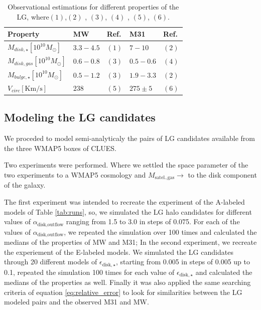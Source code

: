 \documentclass[usenatbib]{mn2e}
\begin{document}
\begin{table}
\centering
\begin{tabular}{|l|l|l|l|l|}
\hline
\hline
 Property &  MW &  Ref. & M31 & Ref.\\
\hline
$M_{disk,\star}[10^{10}M_{\odot}]$ & $3.3-4.5 $ &  $(1)$ & $7-10$ & $(2)$ \\
$M_{disk,gas}[10^{10}M_{\odot}]$ & $0.6-0.8$ &  $(3)$ & $0.5-0.6$ &  $(4)$ \\
$M_{bulge,\star}[10^{10}M_{\odot}]$ & $0.5-1.2$ & $(3)$ & $1.9-3.3$ &  $(2)$ \\
$V_{circ}[\text{Km/s}]$ & $238$ &  $(5)$ & $275\pm 5$ & $(6)$ \\
\hline
\hline
\end{tabular}
\caption{Observational estimations for different properties of the LG,
  where$(1)$\citet{2001ApJ...555..393Z},$(2)$
  \citet{2006MNRAS.366..996G}, $(3)$\citet{2009A&A...505..497Y}, $(4)$
  \citet{2006A&A...453..459N}, $(5)$\citet{2005MNRAS.364..433B},
  $(6)$\citet{2008MNRAS.389.1911S}.} 
\label{tab:lg-observations}
\end{table}

\subsection{Modeling the LG candidates}
\label{sec:modeling-lg}
We proceded to model semi-analyticaly the  pairs of LG candidates
available from the three WMAP5 boxes of CLUES. 

Two experiments were performed. Where we settled the space parameter of the two experiments 
to a WMAP5 cosmology and $M_{\text{satel.,gas}}\to$ to the disk component of the
galaxy. 

The first experiment was intended to recreate the experiment of the
A-labeled models of Table \ref{tab:runs}, so, we simulated the LG halo
candidates for different values of $\alpha_{\text{disk,outflow}}$
ranging from 1.5 to 3.0 in steps of 0.075. For each of the values of
$\alpha_{\text{disk,outflow}}$, we repeated the simulation over 100 times
and calculated the medians of the properties of MW and M31; In the
second experiment, we recreate the experiement of the E-labeled
models.  We simulated the LG candidates through 20 different models of
$\epsilon_{\text{disk},\star}$, starting from 0.005 in steps of 0.005
up to 0.1, repeated the simulation 100 times for each value of
$\epsilon_{\text{disk},\star}$ and calculated the medians of the
properties as well. Finally  it was also applied the same searching
criteria of equation \ref{eq:relative_error} to look for similarities
between the LG modeled pairs and the observed M31 and MW. 
\end{document}
